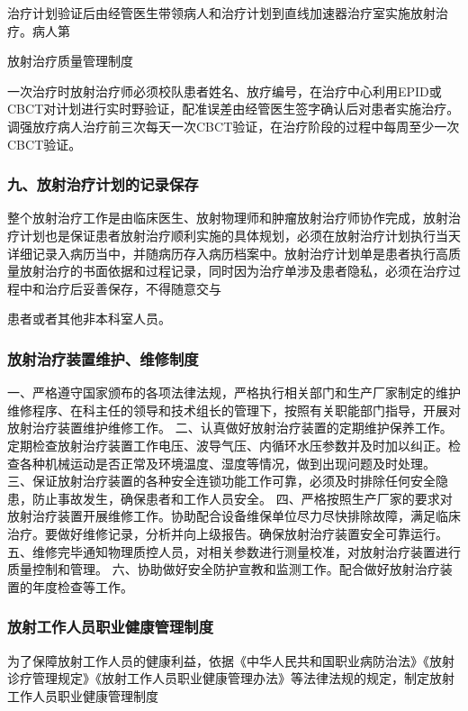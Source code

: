 治疗计划验证后由经管医生带领病人和治疗计划到直线加速器治疗室实施放射治疗。病人第

放射治疗质量管理制度

一次治疗时放射治疗师必须校队患者姓名、放疗编号，在治疗中心利用EPID或CBCT对计划进行实时野验证，配准误差由经管医生签字确认后对患者实施治疗。调强放疗病人治疗前三次每天一次CBCT验证，在治疗阶段的过程中每周至少一次CBCT验证。

\subsubsection{九、放射治疗计划的记录保存}

整个放射治疗工作是由临床医生、放射物理师和肿瘤放射治疗师协作完成，放射治疗计划也是保证患者放射治疗顺利实施的具体规划，必须在放射治疗计划执行当天详细记录入病历当中，并随病历存入病历档案中。放射治疗计划单是患者执行高质量放射治疗的书面依据和过程记录，同时因为治疗单涉及患者隐私，必须在治疗过程中和治疗后妥善保存，不得随意交与

患者或者其他非本科室人员。

\subsubsection{放射治疗装置维护、维修制度}

一、严格遵守国家颁布的各项法律法规，严格执行相关部门和生产厂家制定的维护维修程序、在科主任的领导和技术组长的管理下，按照有关职能部门指导，开展对放射治疗装置维护维修工作。
二、认真做好放射治疗装置的定期维护保养工作。定期检查放射治疗装置工作电压、波导气压、内循环水压参数并及时加以纠正。检查各种机械运动是否正常及环境温度、湿度等情况，做到出现问题及时处理。
三、保证放射治疗装置的各种安全连锁功能工作可靠，必须及时排除任何安全隐患，防止事故发生，确保患者和工作人员安全。
四、严格按照生产厂家的要求对放射治疗装置开展维修工作。协助配合设备维保单位尽力尽快排除故障，满足临床治疗。要做好维修记录，分析并向上级报告。确保放射治疗装置安全可靠运行。
五、维修完毕通知物理质控人员，对相关参数进行测量校准，对放射治疗装置进行质量控制和管理。
六、协助做好安全防护宣教和监测工作。配合做好放射治疗装置的年度检查等工作。

\subsubsection{放射工作人员职业健康管理制度}

为了保障放射工作人员的健康利益，依据《中华人民共和国职业病防治法》《放射诊疗管理规定》《放射工作人员职业健康管理办法》等法律法规的规定，制定放射工作人员职业健康管理制度


